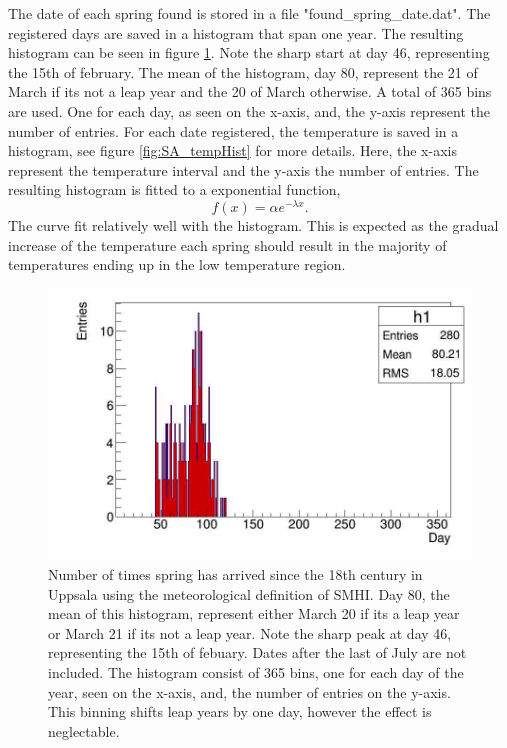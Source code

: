 \documentclass[a4paper,12pt]{article}
\begin{document}
The date of each spring found is stored in a file 
"found\_spring\_date.dat". The registered days are saved in a histogram 
that span one year. The resulting histogram can be seen in figure 
\ref{fig:SA_dayHist}. Note the sharp start at day 46, representing the 
15th of february. The mean of the histogram, day 80, represent the 21 
of March if its not a leap year and the 20 of March otherwise. A total 
of 365 bins are used. One for each day, as seen on the x-axis, and, the 
y-axis represent the number of entries. For each date registered, the 
temperature is saved in a histogram, see figure \ref{fig:SA_tempHist} 
for more details. Here, the x-axis represent the temperature interval 
and the y-axis the number of entries. The resulting histogram is fitted 
to a exponential function,
\begin{equation}
	f(x)=\alpha e^{-\lambda x}.\label{eq:SA_fitfunc}
\end{equation}
The curve fit relatively well with the histogram. This is expected as 
the gradual increase of the temperature each spring should result in 
the majority of temperatures ending up in the low temperature region.
\begin{figure}[htb]
	\centering
	\includegraphics[scale=.4]{../Code/springArrive_dayHist.jpg}
	\caption{Number of times spring has arrived since the 18th century 
	in Uppsala using the meteorological definition of SMHI. Day 80, the 
	mean of this histogram, represent either March 20 if its a leap year 
	or March 21 if its not a leap year. Note the sharp peak at day 46, 
	representing the 15th of febuary. Dates after the last of July are not 
	included. The histogram consist of 365 bins, one for each day of the 
	year, seen on the x-axis, and, the number of entries on the y-axis. 
	This binning shifts leap years by one day, however the effect is 
	neglectable.}
	\label{fig:SA_dayHist}
\end{figure}
\end{document}
